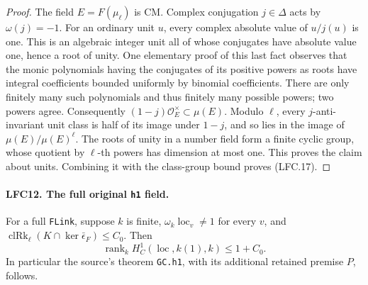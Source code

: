 \documentclass[11pt,a4paper]{article}
\numberwithin{equation}{section}
\theoremstyle{remark}\newtheorem{remark}[theorem]{Remark}
\begin{document}
\begin{proof}
The field \(E=F(\mu_\ell)\) is CM.  Complex conjugation
\(j\in\Delta\) acts by \(\omega(j)=-1\).
For an ordinary unit \(u\), every complex absolute value
of \(u/j(u)\) is one.  This is an algebraic integer unit
all of whose conjugates have absolute value one, hence
a root of unity.  One elementary proof of this last fact
observes that the monic polynomials having the conjugates
of its positive powers as roots have integral coefficients
bounded uniformly by binomial coefficients.  There are
only finitely many such polynomials and thus finitely many
possible powers; two powers agree.
Consequently \((1-j)\mathcal O_E^\times\subset\mu(E)\).
Modulo \(\ell\), every \(j\)-anti-invariant unit class is
half of its image under \(1-j\), and so lies in the image
of \(\mu(E)/\mu(E)^\ell\).
The roots of unity in a number field form a finite cyclic
group, whose quotient by \(\ell\)-th powers has dimension
at most one.  This proves the claim about units.
Combining it with the class-group bound proves (LFC.17).
\end{proof}

\paragraph{LFC12. The full original \texttt{h1} field.}
\label{claim:LFC12}
For a full \texttt{FLink}, suppose \(k\) is finite,
\(\omega_k\operatorname{loc}_v\ne1\) for every \(v\), and
\(\operatorname{clRk}_\ell(K\cap\ker\bar\epsilon_F)\le C_0\).
Then
\[
 \operatorname{rank}_k
       H^1_C(\operatorname{loc},k(1),k)\le1+C_0.          \tag{LFC.19}
\]
In particular the source's theorem \texttt{GC.\allowbreak h1}, with
its additional retained premise \(P\), follows.
\end{document}
